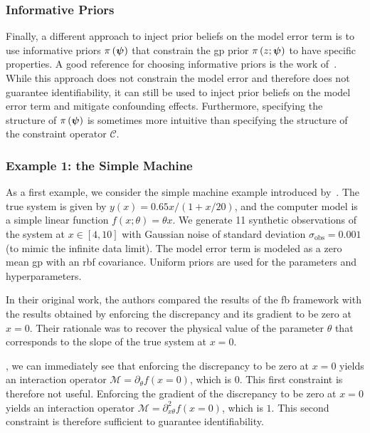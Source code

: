 \subsubsection{Informative Priors}
Finally, a different approach to inject prior beliefs on the model error term is to use informative priors $\pi \left( \boldsymbol{\psi}\right)$ that constrain the \gls{gp} prior $\pi \left( z; \boldsymbol{\psi}\right)$ to have specific properties. A good reference for choosing informative priors is the work of~\cite{stat_dec_th}. While this approach does not constrain the model error and therefore does not guarantee identifiability, it can still be used to inject prior beliefs on the model error term and mitigate confounding effects. Furthermore, specifying the structure of $\pi \left( \boldsymbol{\psi}\right)$ is sometimes more intuitive than specifying the structure of the constraint operator $\mathcal{C}$.


\subsubsection{Example 1: the Simple Machine}
As a first example, we consider the simple machine example introduced by~\cite{hagan_2014}. The true system is given by $y(x) = 0.65x/(1+x/20)$, and the computer model is a simple linear function $f(x; \theta) = \theta x$. We generate 11 synthetic observations of the system at $x \in [4, 10]$ with Gaussian noise of standard deviation $\sigma_{\text{obs}} = 0.001$ (to mimic the infinite data limit). The model error term is modeled as a zero mean \gls{gp} with an \gls{rbf} covariance. Uniform priors are used for the parameters and hyperparameters. 

\smallskip
In their original work, the authors compared the results of the \gls{fb} framework with the results obtained by enforcing the discrepancy and its gradient to be zero at $x=0$. Their rationale was to recover the physical value of the parameter $\theta$ that corresponds to the slope of the true system at $x=0$. 

\smallskip
{}, we can immediately see that enforcing the discrepancy to be zero at $x=0$ yields an interaction operator $\mathcal{M} = \partial_{\theta}f(x=0)$, which is $0$. This first constraint is therefore not useful. Enforcing the gradient of the discrepancy to be zero at $x=0$ yields an interaction operator $\mathcal{M} = \partial^2_{x\theta}f(x=0)$, which is $1$. This second constraint is therefore sufficient to guarantee identifiability.

